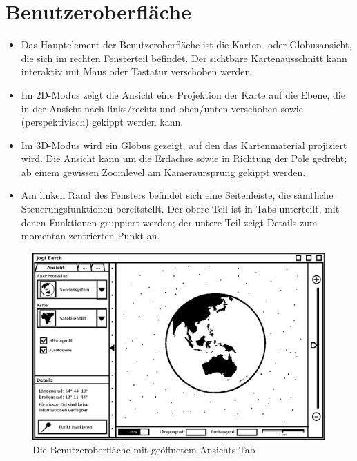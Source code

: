 \documentclass[10pt]{scrreprt}
\begin{document}
\chapter{Benutzeroberfläche}

\begin{itemize}
	\item Das Hauptelement der Benutzeroberfläche ist die Karten- oder Globusansicht, die sich im rechten Fensterteil befindet. Der sichtbare Kartenausschnitt kann interaktiv mit Maus oder Tastatur verschoben werden.
	\item Im 2D-Modus zeigt die Ansicht eine Projektion der Karte auf die Ebene, die in der Ansicht nach links/rechts und oben/unten verschoben sowie (perspektivisch) gekippt werden kann.
	\item Im 3D-Modus wird ein Globus gezeigt, auf den das Kartenmaterial projiziert wird. Die Ansicht kann um die Erdachse sowie in Richtung der Pole gedreht; ab einem gewissen Zoomlevel am Kameraursprung gekippt werden.
	\item Am linken Rand des Fensters befindet sich eine Seitenleiste, die sämtliche Steuerungsfunktionen bereitstellt. Der obere Teil ist in Tabs unterteilt, mit denen Funktionen gruppiert werden; der untere Teil zeigt Details zum momentan zentrierten Punkt an.
\end{itemize}


\vspace{1cm}
\begin{figure}[h]
	\centering
	\includegraphics[scale=0.9]{GUI-Ansicht.eps}
	\caption{Die Benutzeroberfläche mit geöffnetem Ansichts-Tab}
\end{figure}
\end{document}
